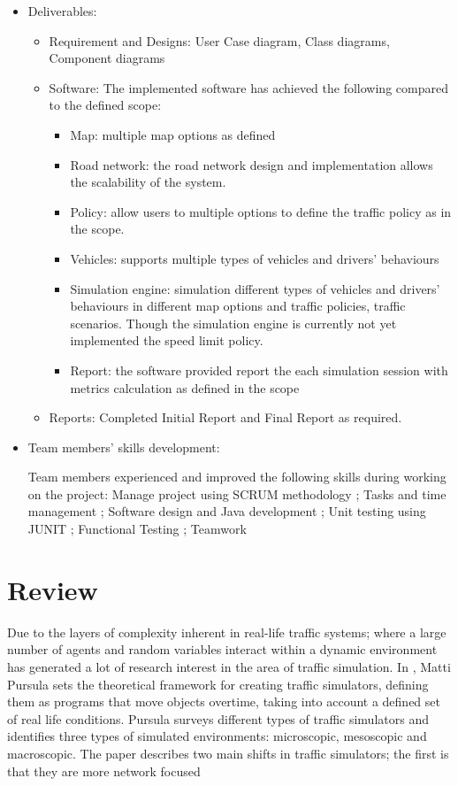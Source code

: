 \documentclass[11pt]{article}
\begin{document}
\begin{itemize}
\item Deliverables:
\begin{itemize}
    \item Requirement and Designs: User Case diagram, Class diagrams, Component diagrams 
    
    \item Software: The implemented software has achieved the following compared to the defined scope:
    \begin{itemize}
    \item Map: multiple map options as defined
    \item Road network: the road network design and implementation allows the scalability of the system.  
    \item Policy: allow users to multiple options to define the traffic policy as in the scope. 
    \item Vehicles: supports multiple types of vehicles and drivers' behaviours 
    \item Simulation engine: simulation different types of vehicles and drivers' behaviours in different map options and traffic policies, traffic scenarios. Though the simulation engine is  currently not yet implemented the speed limit policy.
    \item Report: the software provided report the each simulation session with metrics calculation as defined in the scope

    
    \end{itemize}
    \item Reports: Completed Initial Report and Final Report as required. 
\end{itemize}
\item Team members' skills development: 

\indent Team members experienced and improved the following skills during working on the project:
    Manage project using SCRUM methodology
    ; Tasks and time management
    ; Software design and Java development
    ; Unit testing using JUNIT
    ; Functional Testing
    ; Teamwork


\end{itemize}

\section{Review}

Due to the layers of complexity inherent in real-life traffic systems; where a large number of agents and random variables interact within a dynamic environment has generated a lot of research interest in the area of traffic simulation. In \cite{Pursula}, Matti Pursula sets the theoretical framework for creating traffic simulators, defining them as programs that move objects overtime, taking into account a defined set of real life conditions. Pursula surveys different types of traffic simulators and identifies three types of simulated environments: microscopic, mesoscopic and macroscopic. The paper describes two main shifts in traffic simulators; the first is that they are more network focused 
\end{document}
